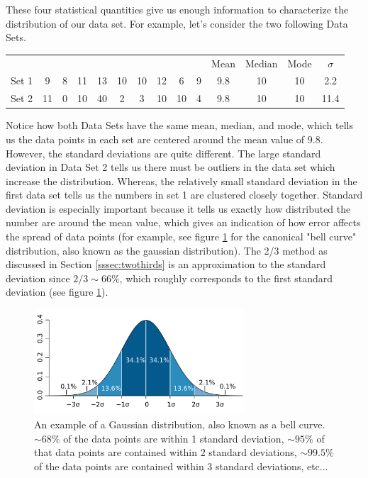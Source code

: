 These four statistical quantities give us enough information to characterize the distribution of our data set. For example, let's consider the two following Data Sets.
\myskip
\begin{center}
\begin{tabular}{c | c | c | c | c | c | c | c | c | c | c | c | c | c  }
&&&&&&&&&&Mean&Median&Mode& $\sigma$ \\
Set 1 & 9&8&11&13&10&10&12&6&9 &9.8&10&10&2.2\\
Set 2 & 11&0&10&40&2&3&10&10&4 &9.8&10&10&11.4
\end{tabular}
\end{center}
\myskip
Notice how both Data Sets have the same mean, median, and mode, which tells us the data points in each set are centered around the mean value of $9.8$. However, the standard deviations are quite different. The large standard deviation in Data Set 2 tells us there must be outliers in the data set which increase the distribution. Whereas, the relatively small standard deviation in the first data set tells us the numbers in set 1 are clustered closely together. Standard deviation is especially important because  it tells us exactly how distributed the number are around the mean value, which gives an indication of how error affects the spread of data points (for example, see figure \ref{fig:bellcurve} for the canonical "bell curve" distribution, also known as the gaussian distribution). The 2/3 method as discussed in Section \ref{sssec:twothirds} is an approximation to the standard deviation since $2/3 \sim 66\%$, which roughly corresponds to the first standard deviation (see figure \ref{fig:bellcurve}).

\begin{figure}[h]
    \begin{center}
        \includegraphics[width=0.7\textwidth]{./Exp1-1/pic/image3.png}
    \end{center}
    \caption{An example of a Gaussian distribution, also known as a bell curve. $\sim 68\%$ of the data points are within 1 standard deviation, $\sim 95\%$ of that data points are contained within 2 standard deviations, $\sim 99.5 \%$ of the data points are contained within 3 standard deviations, etc...}
    \label{fig:bellcurve}
\end{figure}

